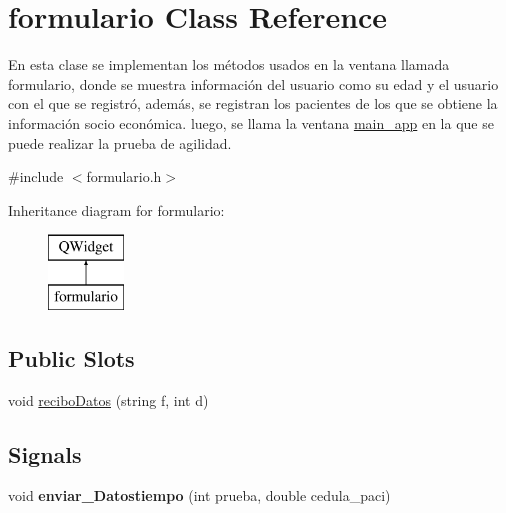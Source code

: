 \hypertarget{classformulario}{}\section{formulario Class Reference}
\label{classformulario}


En esta clase se implementan los métodos usados en la ventana llamada formulario, donde se muestra información del usuario como su edad y el usuario con el que se registró, además, se registran los pacientes de los que se obtiene la información socio económica. luego, se llama la ventana \hyperlink{classmain__app}{main\+\_\+app} en la que se puede realizar la prueba de agilidad.  




{\ttfamily \#include $<$formulario.\+h$>$}

Inheritance diagram for formulario\+:\begin{figure}[H]
\begin{center}
\leavevmode
\includegraphics[height=2.000000cm]{classformulario}
\end{center}
\end{figure}
\subsection*{Public Slots}
\begin{DoxyCompactItemize}
\item 
void \hyperlink{classformulario_abf79e0e6729ee886430517ab1159f03e}{recibo\+Datos} (string f, int d)
\end{DoxyCompactItemize}
\subsection*{Signals}
\begin{DoxyCompactItemize}
\item 
\mbox{\label{classformulario_a61fdc702dd7c38a8090ed7b2da42d79c}} 
void {\bfseries enviar\+\_\+\+Datostiempo} (int prueba, double cedula\+\_\+paci)
\end{DoxyCompactItemize}

